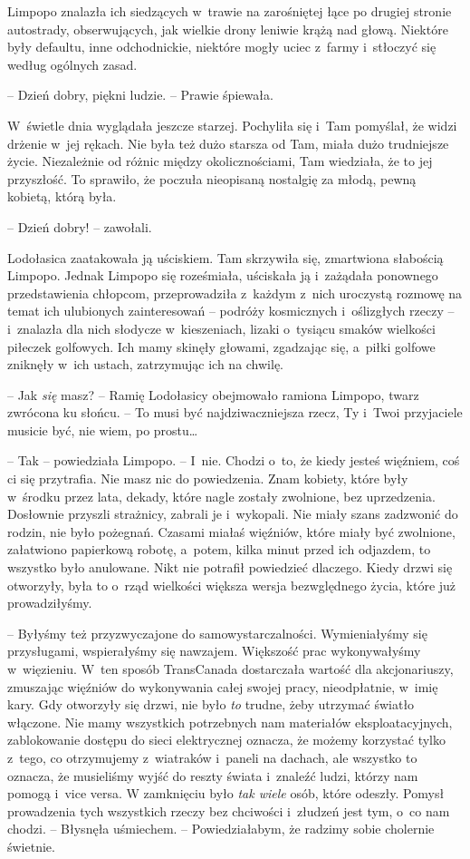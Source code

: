 \documentclass[oneside,polish,11pt,sfheadings]{mwbk}
\begin{document}
Limpopo znalazła ich siedzących w~trawie na zarośniętej łące po drugiej
stronie autostrady, obserwujących, jak wielkie drony leniwie krążą nad
głową. Niektóre były defaultu, inne odchodnickie, niektóre mogły uciec z~farmy i~stłoczyć się według ogólnych zasad.

-- Dzień dobry, piękni ludzie. -- Prawie śpiewała. 

W~świetle dnia
wyglądała jeszcze starzej. Pochyliła się i~Tam pomyślał, że widzi
drżenie w~jej rękach. Nie była też dużo starsza od Tam, miała dużo
trudniejsze życie. Niezależnie od różnic między okolicznościami, Tam
wiedziała, że to jej przyszłość. To sprawiło, że poczuła nieopisaną
nostalgię za młodą, pewną kobietą, którą była.

-- Dzień dobry! -- zawołali. 

Lodołasica zaatakowała ją uściskiem. Tam
skrzywiła się, zmartwiona słabością Limpopo. Jednak Limpopo się
roześmiała, uściskała ją i~zażądała ponownego przedstawienia chłopcom,
przeprowadziła z~każdym z~nich uroczystą rozmowę na temat ich ulubionych
zainteresowań -- podróży kosmicznych i~oślizgłych rzeczy -- i~znalazła dla
nich słodycze w~kieszeniach, lizaki o~tysiącu smaków wielkości piłeczek
golfowych. Ich mamy skinęły głowami, zgadzając się, a~piłki golfowe
zniknęły w~ich ustach, zatrzymując ich na chwilę.

-- Jak \textit{się} masz? -- Ramię Lodołasicy obejmowało ramiona Limpopo,
twarz zwrócona ku słońcu. -- To musi być najdziwaczniejsza rzecz, Ty i~Twoi przyjaciele musicie być, nie wiem, po prostu\ldots 

-- Tak -- powiedziała Limpopo. -- I~nie. Chodzi o~to, że kiedy jesteś
więźniem, coś ci się przytrafia. Nie masz nic do powiedzenia. Znam
kobiety, które były w~środku przez lata, dekady, które nagle zostały
zwolnione, bez uprzedzenia. Dosłownie przyszli strażnicy, zabrali je i~wykopali. Nie miały szans zadzwonić do rodzin, nie było pożegnań.
Czasami miałaś więźniów, które miały być zwolnione, załatwiono
papierkową robotę, a~potem, kilka minut przed ich odjazdem, to wszystko
było anulowane. Nikt nie potrafił powiedzieć dlaczego. Kiedy drzwi się
otworzyły, była to o~rząd wielkości większa wersja bezwględnego życia,
które już prowadziłyśmy.

-- Byłyśmy też przyzwyczajone do samowystarczalności. Wymieniałyśmy się
przysługami, wspierałyśmy się nawzajem. Większość prac wykonywałyśmy w~więzieniu. W~ten sposób TransCanada dostarczała wartość dla
akcjonariuszy, zmuszając więźniów do wykonywania całej swojej pracy,
nieodpłatnie, w~imię kary. Gdy otworzyły się drzwi, nie było \textit{to}
trudne, żeby utrzymać światło włączone. Nie mamy wszystkich potrzebnych
nam materiałów eksploatacyjnych, zablokowanie dostępu do sieci
elektrycznej oznacza, że możemy korzystać tylko z~tego, co otrzymujemy z~wiatraków i~paneli na dachach, ale wszystko to oznacza, że musieliśmy
wyjść do reszty świata i~znaleźć ludzi, którzy nam pomogą i~vice versa.
W zamknięciu było \textit{tak wiele} osób, które odeszły. Pomysł
prowadzenia tych wszystkich rzeczy bez chciwości i~złudzeń jest tym, o~co nam chodzi. -- Błysnęła uśmiechem. -- Powiedziałabym, że radzimy sobie
cholernie świetnie.
\end{document}

